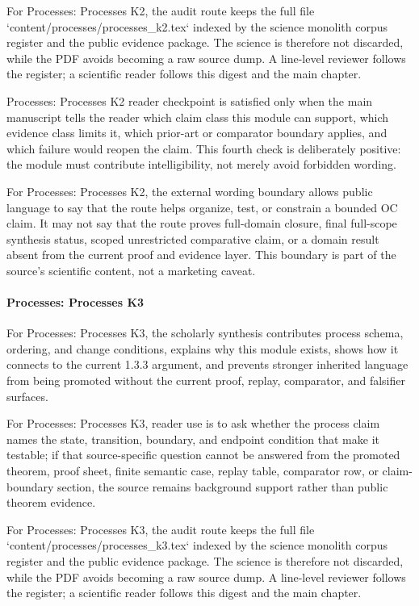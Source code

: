 For Processes: Processes K2, the audit route keeps the full file `content/processes/processes\_k2.tex` indexed by the science monolith corpus register and the public evidence package. The science is therefore not discarded, while the PDF avoids becoming a raw source dump. A line-level reviewer follows the register; a scientific reader follows this digest and the main chapter.


Processes: Processes K2 reader checkpoint is satisfied only when the main manuscript tells the reader which claim class this module can support, which evidence class limits it, which prior-art or comparator boundary applies, and which failure would reopen the claim. This fourth check is deliberately positive: the module must contribute intelligibility, not merely avoid forbidden wording.


For Processes: Processes K2, the external wording boundary allows public language to say that the route helps organize, test, or constrain a bounded OC claim. It may not say that the route proves full-domain closure, final full-scope synthesis status, scoped unrestricted comparative claim, or a domain result absent from the current proof and evidence layer. This boundary is part of the source's scientific content, not a marketing caveat.


\paragraph{Processes: Processes K3}

For Processes: Processes K3, the scholarly synthesis contributes process schema, ordering, and change conditions, explains why this module exists, shows how it connects to the current 1.3.3 argument, and prevents stronger inherited language from being promoted without the current proof, replay, comparator, and falsifier surfaces.


For Processes: Processes K3, reader use is to ask whether the process claim names the state, transition, boundary, and endpoint condition that make it testable; if that source-specific question cannot be answered from the promoted theorem, proof sheet, finite semantic case, replay table, comparator row, or claim-boundary section, the source remains background support rather than public theorem evidence.


For Processes: Processes K3, the audit route keeps the full file `content/processes/processes\_k3.tex` indexed by the science monolith corpus register and the public evidence package. The science is therefore not discarded, while the PDF avoids becoming a raw source dump. A line-level reviewer follows the register; a scientific reader follows this digest and the main chapter.


